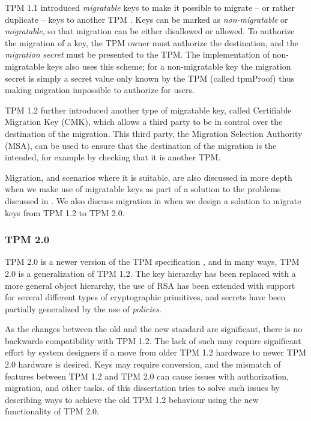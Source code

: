 TPM 1.1 introduced \emph{migratable} keys to make it possible to migrate -- or rather duplicate -- keys to another TPM \cite{TPM1.1bspec}.
Keys can be marked as \emph{non-migratable} or \emph{migratable}, so that migration can be either disallowed or allowed.
To authorize the migration of a key, the TPM owner must authorize the destination, and the \emph{migration secret} must be presented to the TPM.
The implementation of non-migratable keys also uses this scheme; for a non-migratable key the migration secret is simply a secret value only known by the TPM (called tpmProof) thus making migration impossible to authorize for users.

TPM 1.2 further introduced another type of migratable key, called Certifiable Migration Key (CMK), which allows a third party to be in control over the destination of the migration.
This third party, the Migration Selection Authority (MSA), can be used to ensure that the destination of the migration is the intended, for example by checking that it is another TPM.

Migration, and scenarios where it is suitable, are also discussed in more depth when we make use of migratable keys as part of a solution to the problems discussed in .
We also discuss migration in  when we design a solution to migrate keys from TPM 1.2 to TPM 2.0.

\subsubsection{TPM 2.0}
\label{sec:kappa-tpm20}

TPM 2.0 is a newer version of the TPM specification \cite{TPM2.0r38}, and in many ways, TPM 2.0 is a generalization of TPM 1.2.
The key hierarchy has been replaced with a more general object hierarchy,
the use of RSA has been extended with support for several different types of cryptographic primitives,
and secrets have been partially generalized by the use of \emph{policies}.

As the changes between the old and the new standard are significant, there is no backwards compatibility with TPM 1.2.
The lack of such may require significant effort by system designers if a move from older TPM 1.2 hardware to newer TPM 2.0 hardware is desired.
Keys may require conversion, and the mismatch of features between TPM 1.2 and TPM 2.0 can cause issues with authorization, migration, and other tasks.
 of this dissertation tries to solve such issues by describing ways to achieve the old TPM 1.2 behaviour using the new functionality of TPM 2.0.

